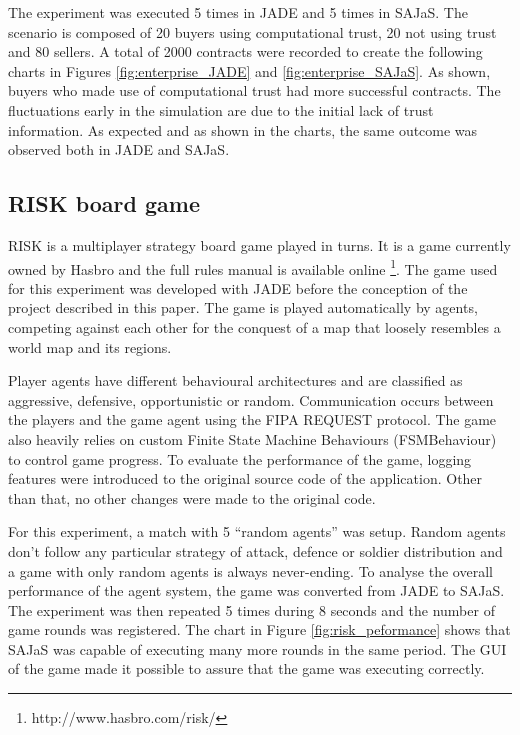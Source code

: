 \documentclass[a4paper,twoside]{article}
\begin{document}
The experiment was executed 5 times in JADE and 5 times in SAJaS. The scenario is composed of 20 buyers using computational trust, 20 not using trust and 80 sellers. A total of 2000 contracts were recorded to create the following charts in Figures \ref{fig:enterprise_JADE} and \ref{fig:enterprise_SAJaS}. As shown, buyers who made use of computational trust had more successful contracts. The fluctuations early in the simulation are due to the initial lack of trust information. As expected and as shown in the charts, the same outcome was observed both in JADE and SAJaS.



\subsection{RISK board game}

RISK is a multiplayer strategy board game played in turns. It is a game currently owned by Hasbro and the full rules manual is available online \footnote{http://www.hasbro.com/risk/}. The game used for this experiment was developed with JADE before the conception of the project described in this paper. The game is played automatically by agents, competing against each other for the conquest of a map that loosely resembles a world map and its regions. 

Player agents have different behavioural architectures and are classified as aggressive, defensive, opportunistic or random. Communication occurs between the players and the game agent using the FIPA REQUEST protocol. The game also heavily relies on custom Finite State Machine Behaviours (FSMBehaviour) to control game progress. To evaluate the performance of the game, logging features were introduced to the original source code of the application. Other than that, no other changes were made to the original code.

For this experiment, a match with 5 ``random agents'' was setup. Random agents don't follow any particular strategy of attack, defence or soldier distribution and a game with only random agents is always never-ending. To analyse the overall performance of the agent system, the game was converted from JADE to SAJaS. The experiment was then repeated 5 times during 8 seconds and the number of game rounds was registered. The chart in Figure \ref{fig:risk_peformance} shows that SAJaS was capable of executing many more rounds in the same period. The GUI of the game made it possible to assure that the game was executing correctly.
\end{document}
